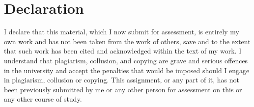 \documentclass[11pt,a4paper]{article}
\begin{document}
\section*{Declaration}
I declare that this material, which I now submit for assessment, is entirely
my own work and has not been taken from the work of others, save and to the
extent that such work has been cited and acknowledged within the text of my
work. I understand that plagiarism, collusion, and copying are grave and
serious offences in the university and accept the penalties that would be
imposed should I engage in plagiarism, collusion or copying. This
assignment, or any part of it, has not been previously submitted by me or
any other person for assessment on this or any other course of study.
\end{document}
